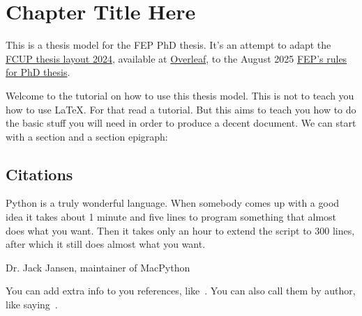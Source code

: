 
\chapter{Chapter Title Here}


\label{ChapterTemplate}


This is a thesis model for the FEP PhD thesis. It's an attempt to adapt the 
\href{https://www.overleaf.com/latex/templates/fcup-thesis-layout-2024/gpbvtwzckzgm}{FCUP thesis layout 2024}, 
available at \href{https://www.overleaf.com/}{Overleaf}, 
to the August 2025 \href{https://sigarra.up.pt/fep/pt/conteudos_geral.ver?pct_pag_id=1009493\&pct_parametros=pv_unidade=7\&pct_grupo=28581\#28581}{FEP's rules for PhD thesis}.

Welcome to the tutorial on how to use this thesis model. This is not to teach
you how to use \LaTeX. For that read a tutorial. But this aims to teach you how
to do the basic stuff you will need in order to produce a decent document.
We can start with a section and a section epigraph:

\section{Citations}
\epigraph{Python is a truly wonderful language. When somebody comes up with a good idea it takes about 1 minute and five lines to program something that almost does what you want. Then it takes only an hour to extend the script to 300 lines, after which it still does almost what you want.}{Dr. Jack Jansen,  maintainer of MacPython}

You can add extra info to you references, like~\parencite[section 3]{Fienup1982}. You
can also call them by author, like saying~\textcite{Fienup1982}.

